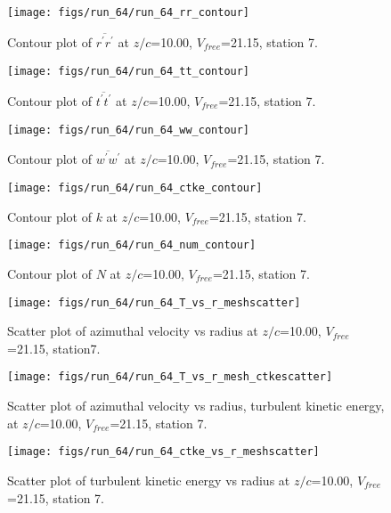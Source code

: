 \begin{figure}[H]
\centering
\texttt{[image: figs/run\_64/run\_64\_rr\_contour]}
\caption{Contour plot of $\overline{r^\prime r^\prime}$ at $z/c$=10.00, $V_{free}$=21.15, station 7.}
\label{fig:run_64_rr_contour}
\end{figure}


\begin{figure}[H]
\centering
\texttt{[image: figs/run\_64/run\_64\_tt\_contour]}
\caption{Contour plot of $\overline{t^\prime t^\prime}$ at $z/c$=10.00, $V_{free}$=21.15, station 7.}
\label{fig:run_64_tt_contour}
\end{figure}


\begin{figure}[H]
\centering
\texttt{[image: figs/run\_64/run\_64\_ww\_contour]}
\caption{Contour plot of $\overline{w^\prime w^\prime}$ at $z/c$=10.00, $V_{free}$=21.15, station 7.}
\label{fig:run_64_ww_contour}
\end{figure}


\begin{figure}[H]
\centering
\texttt{[image: figs/run\_64/run\_64\_ctke\_contour]}
\caption{Contour plot of $k$ at $z/c$=10.00, $V_{free}$=21.15, station 7.}
\label{fig:run_64_ctke_contour}
\end{figure}


\begin{figure}[H]
\centering
\texttt{[image: figs/run\_64/run\_64\_num\_contour]}
\caption{Contour plot of $N$ at $z/c$=10.00, $V_{free}$=21.15, station 7.}
\label{fig:run_64_num_contour}
\end{figure}


\begin{figure}[H]
\centering
\texttt{[image: figs/run\_64/run\_64\_T\_vs\_r\_meshscatter]}
\caption{Scatter plot of azimuthal velocity vs radius at $z/c$=10.00, $V_{free}$=21.15, station7.}
\label{fig:run_64_T_vs_r_meshscatter}
\end{figure}


\begin{figure}[H]
\centering
\texttt{[image: figs/run\_64/run\_64\_T\_vs\_r\_mesh\_ctkescatter]}
\caption{Scatter plot of azimuthal velocity vs radius, turbulent kinetic energy, at $z/c$=10.00, $V_{free}$=21.15, station 7.}
\label{fig:run_64_T_vs_r_mesh_ctkescatter}
\end{figure}


\begin{figure}[H]
\centering
\texttt{[image: figs/run\_64/run\_64\_ctke\_vs\_r\_meshscatter]}
\caption{Scatter plot of turbulent kinetic energy vs radius at $z/c$=10.00, $V_{free}$=21.15, station 7.}
\label{fig:run_64_ctke_vs_r_meshscatter}
\end{figure}


